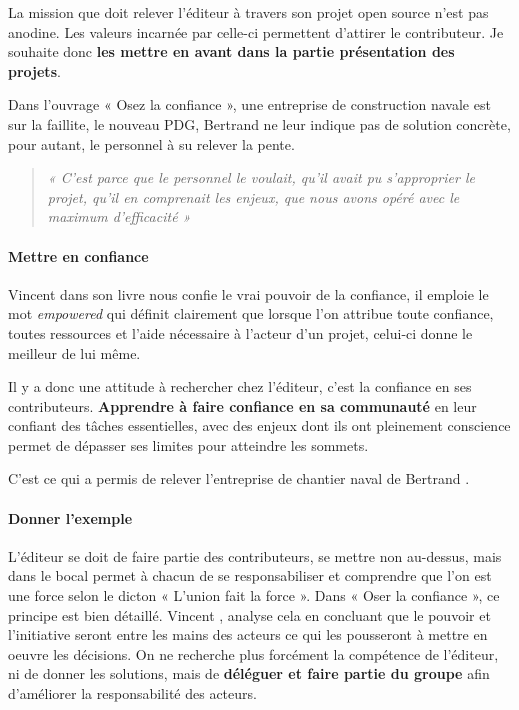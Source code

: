 			La mission que doit relever l'éditeur à travers son projet open source n'est pas anodine. Les valeurs incarnée par celle-ci permettent d'attirer le contributeur. Je souhaite donc \textbf{les mettre en avant dans la partie présentation des projets}.

			Dans l'ouvrage « Osez la confiance », une entreprise de construction navale est sur la faillite, le nouveau PDG, Bertrand  ne leur indique pas de solution concrète, pour autant, le personnel à su relever la pente. 
			\begin{quote}
			\emph{« C'est parce que le personnel le voulait, qu'il avait pu s'approprier le projet, qu'il en comprenait les enjeux, que nous avons opéré avec le maximum d'efficacité »}
			\end{quote}

			\paragraph{Mettre en confiance\\}

			Vincent  dans son livre nous confie le vrai pouvoir de la confiance, il emploie le mot \emph{empowered} qui définit clairement que lorsque l'on attribue toute confiance, toutes ressources et l'aide nécessaire à l'acteur d'un projet, celui-ci donne le meilleur de lui même.

			Il y a donc une attitude à rechercher chez l'éditeur, c'est la confiance en ses contributeurs. \textbf{Apprendre à faire confiance en sa communauté} en leur confiant des tâches essentielles, avec des enjeux dont ils ont pleinement conscience permet de dépasser ses limites pour atteindre les sommets.

			C'est ce qui a permis de relever l'entreprise de chantier naval de Bertrand .

			\paragraph{Donner l'exemple\\}

			L'éditeur se doit de faire partie des contributeurs, se mettre non au-dessus, mais dans le bocal permet à chacun de se responsabiliser et comprendre que l'on est une force selon le dicton « L'union fait la force ». Dans « Oser la confiance », ce principe est bien détaillé. Vincent , analyse cela en concluant que le pouvoir et l'initiative seront entre les mains des acteurs ce qui les pousseront à mettre en oeuvre les décisions. On ne recherche plus forcément la compétence de l'éditeur, ni de donner les solutions, mais de \textbf{déléguer et faire partie du groupe} afin d'améliorer la responsabilité des acteurs.

